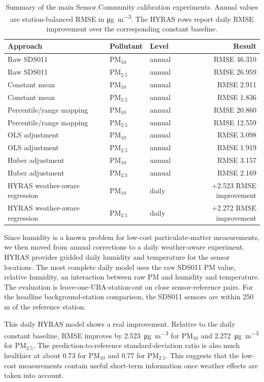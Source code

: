 \documentclass[english, a4paper]{article}
\begin{document}
\begin{table}[ht]
\centering
\small
\caption{Summary of the main Sensor.Community calibration experiments. Annual values are station-balanced RMSE in \si{\micro\gram\per\cubic\meter}. The HYRAS rows report daily RMSE improvement over the corresponding constant baseline.}
\label{tab:calibration_results}
\begin{tabularx}{\textwidth}{Xllr}
\toprule
Approach & Pollutant & Level & Result \\
\midrule
Raw SDS011 & PM$_{10}$ & annual & RMSE 46.310 \\
Raw SDS011 & PM$_{2.5}$ & annual & RMSE 26.959 \\
Constant mean & PM$_{10}$ & annual & RMSE 2.911 \\
Constant mean & PM$_{2.5}$ & annual & RMSE 1.836 \\
Percentile/range mapping & PM$_{10}$ & annual & RMSE 20.860 \\
Percentile/range mapping & PM$_{2.5}$ & annual & RMSE 12.559 \\
OLS adjustment & PM$_{10}$ & annual & RMSE 3.098 \\
OLS adjustment & PM$_{2.5}$ & annual & RMSE 1.919 \\
Huber adjustment & PM$_{10}$ & annual & RMSE 3.157 \\
Huber adjustment & PM$_{2.5}$ & annual & RMSE 2.169 \\
HYRAS weather-aware regression & PM$_{10}$ & daily & +2.523 RMSE improvement \\
HYRAS weather-aware regression & PM$_{2.5}$ & daily & +2.272 RMSE improvement \\
\bottomrule
\end{tabularx}
\end{table}

Since humidity is a known problem for low-cost particulate-matter measurements, we then moved from annual corrections to a daily weather-aware experiment. HYRAS provides gridded daily humidity and temperature for the sensor locations. The most complete daily model uses the raw SDS011 PM value, relative humidity, an interaction between raw PM and humidity and temperature. The evaluation is leave-one-UBA-station-out on close sensor-reference pairs. For the headline background-station comparison, the SDS011 sensors are within 250 m of the reference station.

This daily HYRAS model shows a real improvement. Relative to the daily constant baseline, RMSE improves by \SI{2.523}{\micro\gram\per\cubic\meter} for PM$_{10}$ and \SI{2.272}{\micro\gram\per\cubic\meter} for PM$_{2.5}$. The prediction-to-reference standard-deviation ratio is also much healthier at about 0.73 for PM$_{10}$ and 0.77 for PM$_{2.5}$. This suggests that the low-cost measurements contain useful short-term information once weather effects are taken into account.
\end{document}
